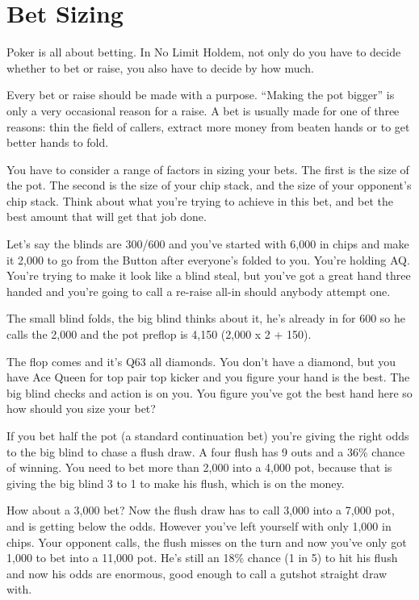 \chapter{Bet Sizing}


Poker is all about betting. In No Limit Holdem, not only do you have to
decide whether to bet or raise, you also have to decide by how much.

Every bet or raise should be made with a purpose. ``Making the pot
bigger'' is only a very occasional reason for a raise. A bet
is usually made for one of three reasons: thin the field of callers,
extract more money from beaten hands or to get better hands to fold.

You have to consider a range of factors in sizing your bets. The first is
the size of the pot. The second is the size of your chip stack, and
the size of your opponent's chip stack. Think about
what you're trying to achieve in this bet, and bet the best amount
that will get that job done.

Let's say the blinds are 300/600 and you've started with 6,000 in chips
and make it 2,000 to go from the Button after everyone's folded to you.
You're holding AQ. You're trying to make it look like a blind steal, but
you've got a great hand three handed and you're going to call a re-raise
all-in should anybody attempt one.

The small blind folds, the big blind thinks about it, he's already in
for 600 so he calls the 2,000 and the pot preflop is 4,150 (2,000 x 2 + 150).

The flop comes and it's Q63 all diamonds. You don't have a diamond, but
you have Ace Queen for top pair top kicker and you figure your hand
is the best. The big blind checks and action is on you. You figure you've
got the best hand here so how should you size your bet?

If you bet half the pot (a standard continuation bet) you're giving the
right odds to the big blind to chase a flush draw. A four flush has 9 outs
and a 36\% chance of winning. You need to bet more than 2,000 into a 4,000 pot,
because that is giving the big blind 3 to 1 to make his flush, which is
on the money.

How about a 3,000 bet? Now the flush draw has to call 3,000 into a 7,000 pot,
and is getting below the odds. However you've left yourself with
only 1,000 in chips. Your opponent calls, the flush misses on the turn and
now you've only got 1,000 to bet into a 11,000 pot. He's still an 18\% chance
(1 in 5) to hit his flush and now his odds are enormous, good enough to
call a gutshot straight draw with.

